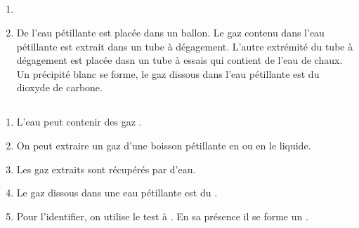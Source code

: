 \subsection*{}

\begin{enumerate}[label=\alph*)]
	\item {}
	
	\item De l'eau pétillante est placée dans un ballon. Le gaz contenu dans l'eau pétillante est extrait dans un tube à dégagement. L'autre extrémité du tube à dégagement est placée dasn un tube à essais qui contient de l'eau de chaux. Un précipité blanc se forme, le gaz dissous dans l'eau pétillante est du dioxyde de carbone.
\end{enumerate}

\subsection*{}

\begin{enumerate}[label=\alph*)]
	\item L'eau peut contenir des gaz .
	\item On peut extraire un gaz d'une boisson pétillante en  ou en  le liquide.
	\item Les gaz extraits sont récupérés par  d'eau.
	\item Le gaz dissous dans une eau pétillante est du .
	\item Pour l'identifier, on utilise le test à . En sa présence il se forme un .
\end{enumerate}

\subsection*{}


